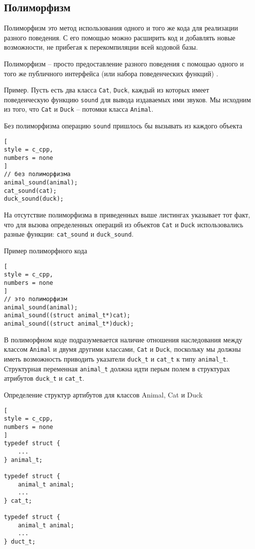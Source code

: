 \documentclass[%
	11pt,
	a4paper,
	utf8,
		]{article}
\begin{document}
\subsection{Полиморфизм}

Полиморфизм это метод использования одного и того же кода для реализации разного поведения. С его помощью можно расширить код и добавлять новые возможности, не прибегая к перекомпиляции всей кодовой базы.

Полиморфизм -- просто предоставление разного поведения с помощью одного и того же публичного интерфейса (или набора поведенческих функций) \cite[]{amini-extreme-c:2022}.

Пример. Пусть есть два класса \verb|Cat|, \verb|Duck|, каждый из которых имеет поведенческую функцию \verb|sound| для вывода издаваемых ими звуков. Мы исходним из того, что \verb|Cat| и \verb|Duck| -- потомки класса \verb|Animal|.

Без полиморфизма операцию \verb|sound| пришлось бы вызывать из каждого объекта 
\begin{lstlisting}[
style = c_cpp,
numbers = none
]
// без полиморфизма
animal_sound(animal);
cat_sound(cat);
duck_sound(duck);
\end{lstlisting}

На отсутствие полиморфизма в приведенных выше листингах указывает тот факт, что для вызова определенных операций из объектов \verb|Cat| и \verb|Duck| использовались разные функции: \verb|cat_sound| и \verb|duck_sound|.

Пример полиморфного кода
\begin{lstlisting}[
style = c_cpp,
numbers = none
]
// это полиморфизм
animal_sound(animal);
animal_sound((struct animal_t*)cat);
animal_sound((struct animal_t*)duck);
\end{lstlisting}

В полиморфном коде подразумевается наличие отношения наследования между классом \verb|Animal| и двумя другими классами, \verb|Cat| и \verb|Duck|, поскольку мы должны иметь возможность приводить указатели \verb|duck_t| и \verb|cat_t| к типу \verb|animal_t|. Структурная переменная \verb|animal_t| должна идти перым полем в структурах атрибутов \verb|duck_t| и \verb|cat_t|.

Определение структур артибутов для классов Animal, Cat и Duck
\begin{lstlisting}[
style = c_cpp,
numbers = none
]
typedef struct {
    ...
} animal_t;

typedef struct {
    animal_t animal;
    ...
} cat_t;

typedef struct {
    animal_t animal;
    ...
} duct_t;
\end{lstlisting}
\end{document}

